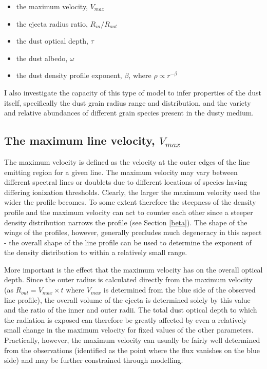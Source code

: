 \begin{itemize}
\item the maximum velocity, $V_{max}$
\item the ejecta radius ratio, $R_{in}/R_{out}$
\item the dust optical depth,  $\tau$
\item the dust albedo, $\omega$ 
\item the dust density profile exponent, $\beta$, where $\rho \propto r^{-\beta}$
\end{itemize}

I also investigate the capacity of this type of model to infer properties of the dust itself, specifically the dust grain radius range and distribution, and the variety and relative abundances of different grain species present in the dusty medium. 


\subsection{The maximum line velocity, $V_{max}$}

The maximum velocity is defined as the velocity at the outer edges of the 
line emitting region for a given line.  The maximum velocity may vary 
between different spectral lines or doublets due to different locations of 
species having differing ionization thresholds.  Clearly, the larger the 
maximum velocity used the wider the profile becomes.  To some extent 
therefore the steepness of the density profile and the maximum velocity 
can act to counter each other since a steeper density distribution narrows 
the profile (see Section \ref{beta}).  The shape of the wings of the 
profiles, however, generally precludes much degeneracy in this aspect - the 
overall shape of the line profile can be used to determine the exponent of 
the density distribution to within a relatively small range.

More important is the effect that the maximum velocity has on the overall 
optical depth.  Since the outer radius is calculated directly from the 
maximum velocity (as $R_{out}=V_{max} \times t$ where $V_{max}$ is determined from the blue side of the observed line profile), the overall volume of the ejecta is determined solely by 
this value and the ratio of the inner and outer radii.  The total dust 
optical depth to which the radiation is exposed can therefore be greatly 
affected by even a relatively small change in the maximum velocity for 
fixed values of the other parameters.  Practically, however, the maximum 
velocity can usually be fairly well determined from the observations 
(identified as the point where the flux vanishes on the blue side) and may 
be further constrained through modelling.

